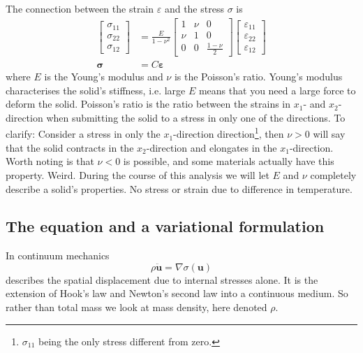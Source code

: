 \documentclass[paper=a4, fontsize=11pt]{scrartcl} %
\begin{document}
The connection between the strain $\varepsilon$ and the stress $\sigma$ is
\begin{align*}
\begin{bmatrix}
\sigma_{11} \\ \sigma_{22} \\ \sigma_{12}
\end{bmatrix}
&= \frac{E}{1-\nu^2}\begin{bmatrix}
1 & \nu & 0 \\
\nu & 1 & 0 \\
0 & 0 & \frac{1-\nu}{2}
\end{bmatrix}
\begin{bmatrix}
\varepsilon_{11} \\ \varepsilon_{22} \\ \varepsilon_{12}
\end{bmatrix} \\
\boldsymbol{\sigma} &= C\boldsymbol{\varepsilon}
\end{align*}
where $E$ is the Young's modulus and $\nu$ is the Poisson's ratio. Young's modulus characterises the solid's stiffness, i.e. large $E$ means that you need a large force to deform the solid. Poisson's ratio  is the ratio between the strains in $x_1$- and $x_2$-direction when submitting the solid to a stress in only one of the directions. To clarify: Consider a stress in only the $x_1$-direction direction\footnote{$\sigma_{11}$ being the only stress different from zero.}, then $\nu>0$ will say that the solid contracts in the $x_2$-direction and elongates in the $x_1$-direction. Worth noting is that $\nu<0$ is possible, and some materials actually have this property. Weird.
During the course of this analysis we will let $E$ and $\nu$ completely describe a solid's properties. No stress or strain due to difference in temperature.

\subsection*{The equation and a variational formulation}
In continuum mechanics
\begin{equation}
\label{vibDiff}
\rho \ddot{\boldsymbol{u}} = \nabla \sigma(\boldsymbol{u})
\end{equation}
describes the spatial displacement due to internal stresses alone. It is the extension of Hook's law and Newton's second law into a continuous medium. So rather than total mass we look at mass density, here denoted $\rho$.
\end{document}
